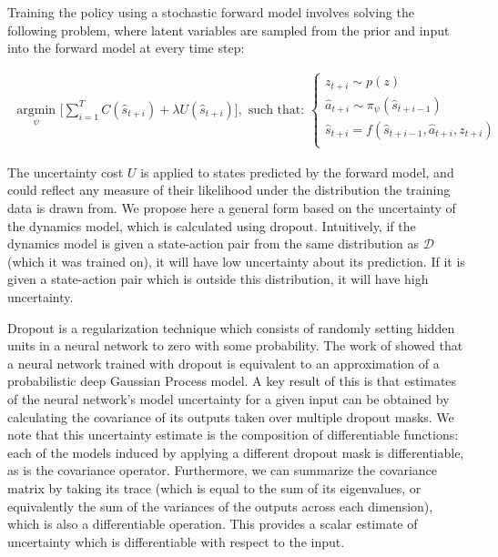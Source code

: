 \documentclass{article} %
\begin{document}
Training the policy using a stochastic forward model involves solving the following problem, where latent variables are sampled from the prior and input into the forward model at every time step:

        \begin{align*}
    \underset{\psi}{\mbox{ argmin }} \Big[ \sum_{i=1}^{T} C(\hat{s}_{t+i}) + \lambda U(\hat{s}_{t+i}) \Big],  \mbox{ such that: }
    \begin{cases}
      z_{t+i} \sim p(z) \\
      \hat{a}_{t+i} \sim \pi_\psi(\hat{s}_{t+i-1}) \\
      \hat{s}_{t+i} = f(\hat{s}_{t+i-1}, \hat{a}_{t+i}, z_{t+i}) \\
      \end{cases}
        \end{align*}

        

        The uncertainty cost $U$ is applied to states predicted by the forward model, and could reflect any measure of their likelihood under the distribution the training data is drawn from.
        We propose here a general form based on the uncertainty of the dynamics model, which is calculated using dropout.
        Intuitively, if the dynamics model is given a state-action pair from the same distribution as $\mathcal{D}$ (which it was trained on), it will have low uncertainty about its prediction.
        If it is given a state-action pair which is outside this distribution, it will have high uncertainty.



    Dropout \citep{Dropout2012, Dropout2014} is a regularization technique which consists of randomly setting hidden units in a neural network to zero with some probability.
    The work of \citep{Gal16} showed that a neural network trained with dropout is equivalent to an approximation of a probabilistic deep Gaussian Process model.
    A key result of this is that estimates of the neural network's model uncertainty for a given input can be obtained by calculating the covariance of its outputs taken over multiple dropout masks.
    We note that this uncertainty estimate is the composition of differentiable functions: each of the models induced by applying a different dropout mask is differentiable, as is the covariance operator.
    Furthermore, we can summarize the covariance matrix by taking its trace (which is equal to the sum of its eigenvalues, or equivalently the sum of the variances of the outputs across each dimension), which is also a differentiable operation. This provides a scalar estimate of uncertainty which is differentiable with respect to the input.
\end{document}
